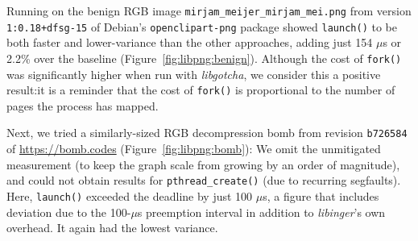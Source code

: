 Running on the benign RGB image \texttt{mirjam\_meijer\_mirjam\_mei.png} from version
\texttt{1:0.18+dfsg-15} of Debian's \texttt{openclipart-png} package showed
\texttt{launch()} to be both faster and lower-variance than the other approaches,
adding just 154 $\mu$s or 2.2\% over the baseline (Figure~\ref{fig:libpng:benign}).
Although the cost
of \texttt{fork()} was significantly higher when run with \textit{libgotcha}, we
consider this a positive result:\@ it is a reminder that the cost of \texttt{fork()}
is proportional to the number of pages the process has mapped.

Next, we tried a similarly-sized RGB decompression bomb from revision
\texttt{b726584} of \url{https://bomb.codes} (Figure~\ref{fig:libpng:bomb}):  We omit
the unmitigated measurement (to keep the graph scale from growing by an order of
magnitude), and could not obtain results for \texttt{pthread\_create()} (due to
recurring segfaults).  Here, \texttt{launch()} exceeded the deadline by just 100
$\mu$s, a figure that includes deviation due to the 100-$\mu$s preemption interval in
addition to \textit{libinger}'s own overhead.  It again had the lowest variance.

